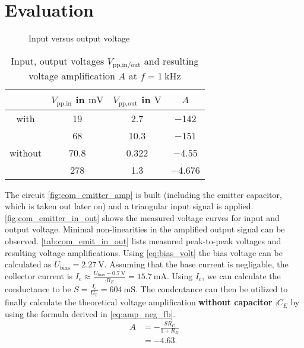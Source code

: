 \section{Evaluation}
\begin{figure}[tbp]
	\centering
	\caption{Input versus output voltage}
	\label{fig:com_emitter_in_out}
\end{figure}
\begin{table}[b!]
	\centering
	\caption{Input, output voltages $V_\text{pp,in/out}$ and resulting voltage amplification $A$ at $f=\SI{1}{\kilo\hertz}$}
	\label{tab:com_emit_in_out}
	\begin{tabular}{S|SSS}
		\toprule
		{}&	{$V_\text{pp,in}$ in $\si{\milli\volt}$}&	{$V_\text{pp,out}$ in $\si{\volt}$}&	{$A$}\\
		\midrule
		{with }	&	\num{19}	&	\num{2.7}	&	\num{-142}\\
		{}	&	\num{68}	&	\num{10.3}	&	\num{-151}\\
		\midrule
		{without }	&	\num{70.8}	&	\num{0.322}	&	\num{-4.55}\\
		{}	&	\num{278}	&	\num{1.3}	&	\num{-4.676}\\
		\bottomrule
	\end{tabular}
\end{table}
The circuit \autoref{fig:com_emitter_amp} is built (including the emitter capacitor, which is taken out later on) and a triangular input signal is applied.
\autoref{fig:com_emitter_in_out} shows the measured voltage curves for input and output voltage.
Minimal non-linearities in the amplified output signal can be observed.
\autoref{tab:com_emit_in_out} lists measured peak-to-peak voltages and resulting voltage amplifications.
Using \autoref{eq:bias_volt} the bias voltage can be calculated as $U_\text{bias}=\SI{2.27}{\volt}$.
Assuming that the base current is negligable, the collector current is $I_\text{c}\approx\frac{U_\text{bias}-\SI{0.7}{\volt}}{\comp{R_E}}=\SI{15.7}{\milli\ampere}$.
Using $I_\text{c}$, we can calculate the conductance to be $S=\frac{I_\text{c}}{U_\text{T}}=\SI{604}{\milli\siemens}$.
The condcutance can then be utilized to finally calculate the theoretical voltage amplification \textbf{without capacitor $\comp{C_E}$} by using the formula derived in \autoref{eq:amp_neg_fb}.
\begin{align*}
	A &= -\frac{SR_\text{C}}{1+R_E} \\
	&=\num{-4.63}.
\end{align*}
